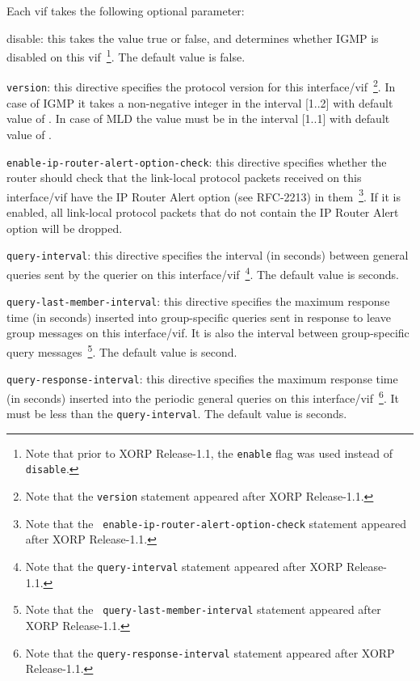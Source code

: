\begin{description}
\begin{description}
  Each vif takes the following optional parameter:
\begin{description}
\item{\stt disable}: this takes the value {\stt true} or {\stt false},
  and determines whether IGMP is disabled on this vif~\footnote{Note
  that prior to XORP Release-1.1, the {\tt enable} flag was used instead of
  {\tt disable}.}.
  The default value is {\stt false}.
\item{\tt version}: this directive specifies the protocol version for this
  interface/vif~\footnote{Note that the {\tt version} statement appeared after
  XORP Release-1.1.}. In case of IGMP it takes a non-negative integer in the
  interval [1..2] with default value of {}.  In case of MLD the value
  must be in the interval [1..1] with default value of {}.
\item{\tt enable-ip-router-alert-option-check}: this directive specifies
  whether the router should check that the link-local protocol packets
  received on this interface/vif have the IP Router Alert option (see
  RFC-2213) in them~\footnote{Note that the {\tt
  enable-ip-router-alert-option-check} statement appeared after XORP
  Release-1.1.}. If it is enabled, all link-local protocol packets that
  do not contain the IP Router Alert option will be dropped.

\item{\tt query-interval}: this directive specifies the interval (in seconds)
  between general queries sent by the querier on this
  interface/vif~\footnote{Note that the {\tt query-interval} statement
  appeared after XORP Release-1.1.}.
  The default value is {} seconds.

\item {\tt query-last-member-interval}: this directive specifies the maximum
  response time (in seconds) inserted into group-specific queries sent in
  response to leave group messages on this interface/vif. It is also the
  interval between group-specific query messages~\footnote{Note that the {\tt
  query-last-member-interval} statement appeared after XORP Release-1.1.}.
  The default value is {} second.

\item {\tt query-response-interval}: this directive specifies the maximum
  response time (in seconds) inserted into the periodic general queries on
  this interface/vif~\footnote{Note that the {\tt query-response-interval}
  statement appeared after XORP Release-1.1.}.
  It must be less than the {\tt query-interval}.
  The default value is {} seconds.


\end{description}
\end{description}
\end{description}
